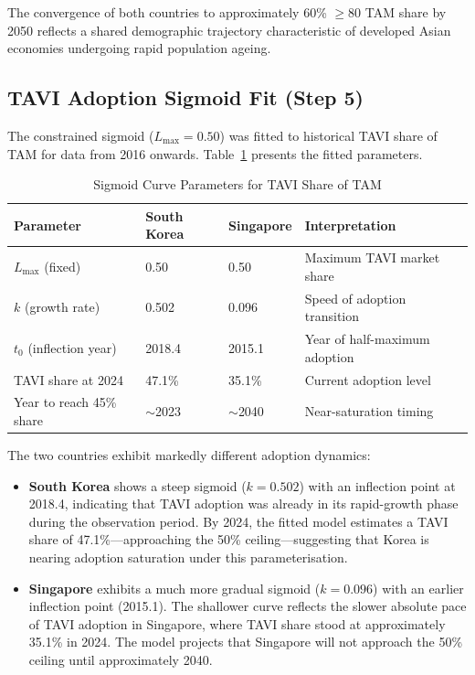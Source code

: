 \documentclass[12pt, a4paper]{article}
\begin{document}
The convergence of both countries to approximately 60\% $\geq$80 TAM share by 2050 reflects a shared demographic trajectory characteristic of developed Asian economies undergoing rapid population ageing.

\subsection{TAVI Adoption Sigmoid Fit (Step 5)}

The constrained sigmoid ($L_{\max} = 0.50$) was fitted to historical TAVI share of TAM for data from 2016 onwards. Table~\ref{tab:sigmoid} presents the fitted parameters.

\begin{table}[H]
\centering
\caption{Sigmoid Curve Parameters for TAVI Share of TAM}
\label{tab:sigmoid}
\smallskip
\begin{tabular}{@{}llll@{}}
\toprule
\textbf{Parameter} & \textbf{South Korea} & \textbf{Singapore} & \textbf{Interpretation} \\
\midrule
$L_{\max}$ (fixed)      & 0.50  & 0.50  & Maximum TAVI market share \\
$k$ (growth rate)        & 0.502 & 0.096 & Speed of adoption transition \\
$t_0$ (inflection year)  & 2018.4 & 2015.1 & Year of half-maximum adoption \\
TAVI share at 2024       & 47.1\% & 35.1\% & Current adoption level \\
Year to reach 45\% share & $\sim$2023 & $\sim$2040 & Near-saturation timing \\
\bottomrule
\end{tabular}
\end{table}

The two countries exhibit markedly different adoption dynamics:

\begin{itemize}[leftmargin=*, itemsep=4pt]
    \item \textbf{South Korea} shows a steep sigmoid ($k = 0.502$) with an inflection point at 2018.4, indicating that TAVI adoption was already in its rapid-growth phase during the observation period. By 2024, the fitted model estimates a TAVI share of 47.1\%---approaching the 50\% ceiling---suggesting that Korea is nearing adoption saturation under this parameterisation.

    \item \textbf{Singapore} exhibits a much more gradual sigmoid ($k = 0.096$) with an earlier inflection point (2015.1). The shallower curve reflects the slower absolute pace of TAVI adoption in Singapore, where TAVI share stood at approximately 35.1\% in 2024. The model projects that Singapore will not approach the 50\% ceiling until approximately 2040.
\end{itemize}
\end{document}
